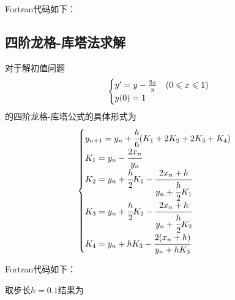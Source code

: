 Fortran代码如下：




\subsection{四阶龙格-库塔法求解}
对于解初值问题
$$\begin{cases}y\rq{}=y-\frac{2x}{y} &(0 \le x \le 1)\\ y(0)=1\end{cases}$$
的四阶龙格-库塔公式的具体形式为
$$\begin{cases}
y_{n+1}=y_n+\cfrac{h}{6}(K_1+2K_2+2K_3+K_4)\\
K_1=y_n-\cfrac{2x_n}{y_n}\\
K_2=y_n+\cfrac{h}{2}K_1-\cfrac{2x_n+h}{y_n+\cfrac{h}{2}K_1}\\
K_3=y_n+\cfrac{h}{2}K_2-\cfrac{2x_n+h}{y_n+\cfrac{h}{2}K_2}\\
K_4=y_n+hK_3-\cfrac{2(x_n+h)}{y_n+hK_3}
\end{cases}$$

Fortran代码如下：


取步长$h=0.1$结果为

